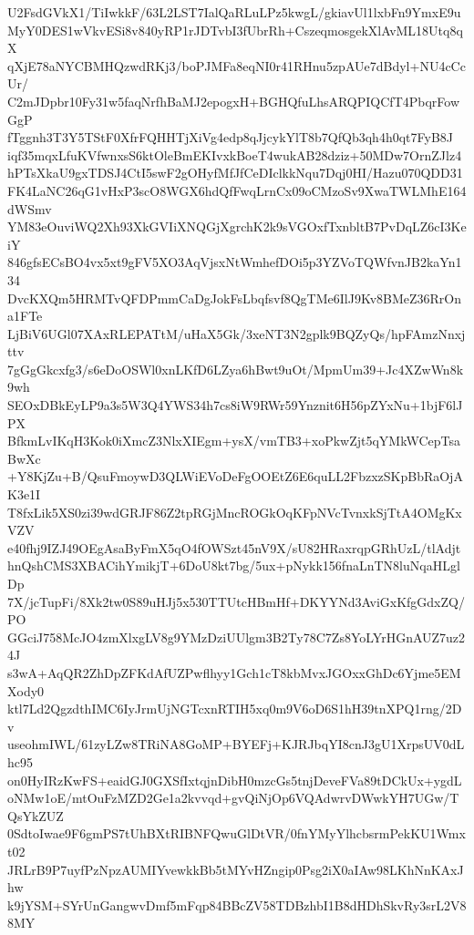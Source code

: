 U2FsdGVkX1/TiIwkkF/63L2LST7IalQaRLuLPz5kwgL/gkiavUl1lxbFn9YmxE9u
MyY0DES1wVkvESi8v840yRP1rJDTvbI3fUbrRh+CszeqmosgekXlAvML18Utq8qX
qXjE78aNYCBMHQzwdRKj3/boPJMFa8eqNI0r41RHnu5zpAUe7dBdyl+NU4cCcUr/
C2mJDpbr10Fy31w5faqNrfhBaMJ2epogxH+BGHQfuLhsARQPIQCfT4PbqrFowGgP
fTggnh3T3Y5TStF0XfrFQHHTjXiVg4edp8qJjcykYlT8b7QfQb3qh4h0qt7FyB8J
iqf35mqxLfuKVfwnxsS6ktOleBmEKIvxkBoeT4wukAB28dziz+50MDw7OrnZJlz4
hPTsXkaU9gxTDSJ4CtI5swF2gOHyfMfJfCeDIclkkNqu7Dqj0HI/Hazu070QDD31
FK4LaNC26qG1vHxP3scO8WGX6hdQfFwqLrnCx09oCMzoSv9XwaTWLMhE164dWSmv
YM83eOuviWQ2Xh93XkGVIiXNQGjXgrchK2k9sVGOxfTxnbltB7PvDqLZ6cI3KeiY
846gfsECsBO4vx5xt9gFV5XO3AqVjsxNtWmhefDOi5p3YZVoTQWfvnJB2kaYn134
DvcKXQm5HRMTvQFDPmmCaDgJokFsLbqfsvf8QgTMe6IlJ9Kv8BMeZ36RrOna1FTe
LjBiV6UGl07XAxRLEPATtM/uHaX5Gk/3xeNT3N2gplk9BQZyQs/hpFAmzNnxjttv
7gGgGkcxfg3/s6eDoOSWl0xnLKfD6LZya6hBwt9uOt/MpmUm39+Jc4XZwWn8k9wh
SEOxDBkEyLP9a3s5W3Q4YWS34h7cs8iW9RWr59Ynznit6H56pZYxNu+1bjF6lJPX
BfkmLvIKqH3Kok0iXmcZ3NlxXIEgm+ysX/vmTB3+xoPkwZjt5qYMkWCepTsaBwXc
+Y8KjZu+B/QsuFmoywD3QLWiEVoDeFgOOEtZ6E6quLL2FbzxzSKpBbRaOjAK3e1I
T8fxLik5XS0zi39wdGRJF86Z2tpRGjMncROGkOqKFpNVcTvnxkSjTtA4OMgKxVZV
e40fhj9IZJ49OEgAsaByFmX5qO4fOWSzt45nV9X/sU82HRaxrqpGRhUzL/tlAdjt
hnQshCMS3XBACihYmikjT+6DoU8kt7bg/5ux+pNykk156fnaLnTN8luNqaHLglDp
7X/jcTupFi/8Xk2tw0S89uHJj5x530TTUtcHBmHf+DKYYNd3AviGxKfgGdxZQ/PO
GGciJ758McJO4zmXlxgLV8g9YMzDziUUlgm3B2Ty78C7Zs8YoLYrHGnAUZ7uz24J
s3wA+AqQR2ZhDpZFKdAfUZPwflhyy1Gch1cT8kbMvxJGOxxGhDc6Yjme5EMXody0
ktl7Ld2QgzdthIMC6IyJrmUjNGTcxnRTIH5xq0m9V6oD6S1hH39tnXPQ1rng/2Dv
useohmIWL/61zyLZw8TRiNA8GoMP+BYEFj+KJRJbqYI8cnJ3gU1XrpsUV0dLhc95
on0HyIRzKwFS+eaidGJ0GXSfIxtqjnDibH0mzcGs5tnjDeveFVa89tDCkUx+ygdL
oNMw1oE/mtOuFzMZD2Ge1a2kvvqd+gvQiNjOp6VQAdwrvDWwkYH7UGw/TQsYkZUZ
0SdtoIwae9F6gmPS7tUhBXtRIBNFQwuGlDtVR/0fnYMyYlhcbsrmPekKU1Wmxt02
JRLrB9P7uyfPzNpzAUMIYvewkkBb5tMYvHZngip0Psg2iX0aIAw98LKhNnKAxJhw
k9jYSM+SYrUnGangwvDmf5mFqp84BBcZV58TDBzhbI1B8dHDhSkvRy3srL2V88MY
